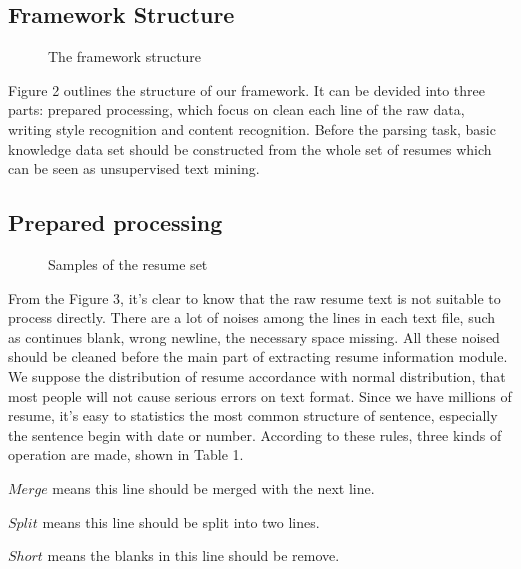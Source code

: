 \documentclass{acm_proc_article-sp}
\begin{document}
\subsection{Framework Structure}

\begin{figure}\label{frame-struct}
\centering
{}
\caption{The framework structure}
\end{figure}

Figure 2 outlines the structure of our framework.
It can be devided into three parts: prepared processing, which focus on clean each line of the raw data, writing style recognition and content recognition.
Before the parsing task, basic knowledge data set should be constructed from the whole set of resumes which can be seen as unsupervised text mining.

\subsection{Prepared processing}


\begin{figure*}\label{resumes-sample}

\caption{Samples of the resume set}
\end{figure*}


From the Figure 3, it's clear to know that the raw resume text is not suitable to process directly. 
There are a lot of noises among the lines in each text file, such as continues blank, wrong newline, the necessary space missing. 
All these noised should be cleaned before the main part of extracting resume information module. 
We suppose the distribution of resume accordance with normal distribution, that most people will not cause serious errors on text format.
Since we have millions of resume, it's easy to statistics the most common structure of sentence, especially the sentence begin with date or number. 
According to these rules, three kinds of operation are made, shown in Table 1.

$Merge$ means this line should be merged with the next line. 

$Split$ means this line should be split into two lines.

$Short$ means the blanks in this line should be remove. 
\end{document}
